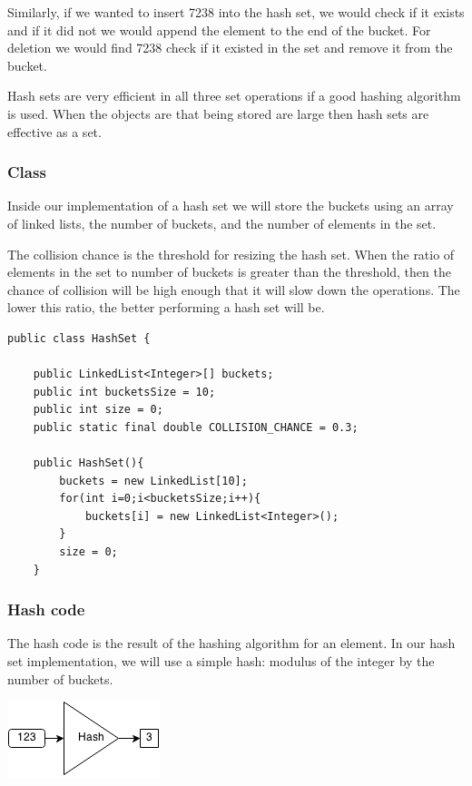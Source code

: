 \documentclass[11pt,oneside]{book}
\makeatletter
\def\maxwidth#1{\ifdim\Gin@nat@width>#1 #1\else\Gin@nat@width\fi}
\makeatother
\begin{document}
Similarly, if we wanted to insert 7238 into the hash set, we would check if it exists and if it did not we would append the element to the end of the bucket. For deletion we would find 7238 check if it existed in the set and remove it from the bucket.

Hash sets are very efficient in all three set operations if a good hashing algorithm is used. When the objects are that being stored are large then hash sets are effective as a set.

\subsubsection{Class}

Inside our implementation of a hash set we will store the buckets using an array of linked lists, the number of buckets, and the number of elements in the set.

The collision chance is the threshold for resizing the hash set. When the ratio of elements in the set to number of buckets is greater than the threshold, then the chance of collision will be high enough that it will slow down the operations. The lower this ratio, the better performing a hash set will be.

\begin{lstlisting}
public class HashSet {

    public LinkedList<Integer>[] buckets;
    public int bucketsSize = 10;
    public int size = 0;
    public static final double COLLISION_CHANCE = 0.3;
    
    public HashSet(){
        buckets = new LinkedList[10];
        for(int i=0;i<bucketsSize;i++){
            buckets[i] = new LinkedList<Integer>();
        }
        size = 0;
    }
\end{lstlisting}

\subsubsection{Hash code}

The hash code is the result of the hashing algorithm for an element. In our hash set implementation, we will use a simple hash: modulus of the integer by the number of buckets.

\vspace{5px}\includegraphics[width=\maxwidth{\textwidth}]{hashcode.png}
\end{document}
